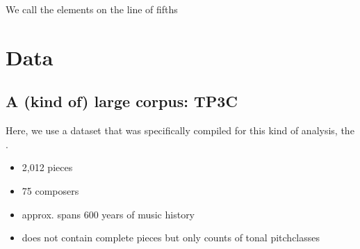 \documentclass[letterpaper,10pt,english]{sphinxmanual}
\begin{document}
\begin{sphinxVerbatim}[commandchars=\\\{\}]
 \PYG{p}{]}
\end{sphinxVerbatim}

\begin{sphinxVerbatim}[commandchars=\\\{\}]
 
\end{sphinxVerbatim}

\begin{sphinxVerbatim}[commandchars=\\\{\}]
\end{sphinxVerbatim}

We call the elements on the line of fifths 


\section{Data}
\label{\detokenize{data-driven_music_history:data}}

\subsection{A (kind of) large corpus: TP3C}
\label{\detokenize{data-driven_music_history:a-kind-of-large-corpus-tp3c}}
Here, we use a dataset that was specifically compiled for this kind of
analysis, the  .
\begin{itemize}
\item {} 
2,012 pieces

\item {} 
75 composers

\item {} 
approx. spans 600 years of music history

\item {} 
does not contain complete pieces but only counts of tonal
pitch\sphinxhyphen{}classes

\end{itemize}

\begin{sphinxVerbatim}[commandchars=\\\{\}]
    

  
  

\end{sphinxVerbatim}
\end{document}
